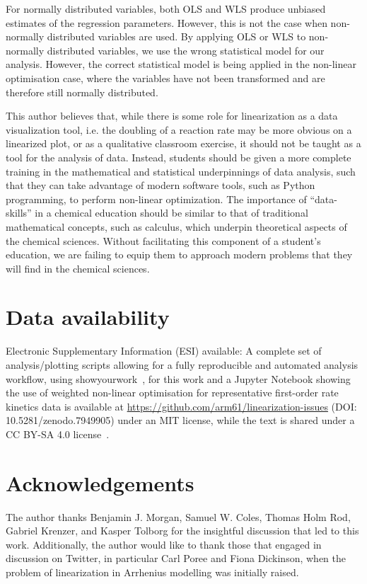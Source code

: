 \documentclass[journal=jceda8,manuscript=article]{achemso}
\begin{document}
For normally distributed variables, both OLS and WLS produce unbiased estimates of the regression parameters. 
However, this is not the case when non-normally distributed variables are used. 
By applying OLS or WLS to non-normally distributed variables, we use the wrong statistical model for our analysis. 
However, the correct statistical model is being applied in the non-linear optimisation case, where the variables have not been transformed and are therefore still normally distributed. 

This author believes that, while there is some role for linearization as a data visualization tool, i.e. the doubling of a reaction rate may be more obvious on a linearized plot, or as a qualitative classroom exercise, it should not be taught as a tool for the analysis of data. 
Instead, students should be given a more complete training in the mathematical and statistical underpinnings of data analysis, such that they can take advantage of modern software tools, such as Python programming, to perform non-linear optimization. 
The importance of ``data-skills'' in a chemical education should be similar to that of traditional mathematical concepts, such as calculus, which underpin theoretical aspects of the chemical sciences.
Without facilitating this component of a student's education, we are failing to equip them to approach modern problems that they will find in the chemical sciences. 

\section*{Data availability}

Electronic Supplementary Information (ESI) available: A complete set of analysis/plotting scripts allowing for a fully reproducible and automated analysis workflow, using showyourwork~\cite{luger_showyourwork_2021}, for this work and a Jupyter Notebook showing the use of weighted non-linear optimisation for representative first-order rate kinetics data is available at \url{https://github.com/arm61/linearization-issues} (DOI: 10.5281/zenodo.7949905) under an MIT license, while the text is shared under a CC BY-SA 4.0 license~\cite{mccluskey_github_2023}.

\section*{Acknowledgements}

The author thanks Benjamin J. Morgan, Samuel W. Coles, Thomas Holm Rod, Gabriel Krenzer, and Kasper Tolborg for the insightful discussion that led to this work. 
Additionally, the author would like to thank those that engaged in discussion on Twitter, in particular Carl Poree and Fiona Dickinson, when the problem of linearization in Arrhenius modelling was initially raised. 


\end{document}
